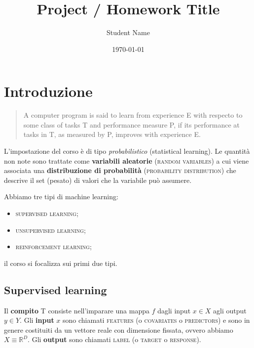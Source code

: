 \documentclass[10pt]{article}
\begin{document}
\title{Project / Homework Title}
\author{Student Name}
\date{\today}

\maketitle

\renewcommand{\vec}[1]{\boldsymbol{#1}}
\newcommand{\tens}[1]{\mathsf{#1}}
\newcommand{\pd}[2]{\frac{\partial #1}{\partial #2} }
\newcommand{\HALF}{\frac{1}{2}}
\newcommand{\DS}{\displaystyle}

\newcommand{\im}[1]{\textsc{#1}}

\theoremstyle{definition}
\newtheorem{example}{Esempio}[section]

\section{Introduzione}
%
%
\begin{quotation}
A computer program is said to learn from experience E with respecto to some class of tasks T and performance measure P, if its performance at tasks in T, as measured by P, improves with experience E.
\end{quotation}
L'impostazione del corso è di tipo \textit{probabilistico} (statistical learning). Le quantità non note sono trattate come \textbf{variabili aleatorie} (\im{random variables}) a cui viene associata una \textbf{distribuzione di probabilità} (\im{probability distribution}) che descrive il set (pesato) di valori che la variabile può assumere.

Abbiamo tre tipi di machine learning:
\begin{itemize}
\item \im{supervised learning};
\item \im{unsupervised learning};
\item \im{reinforcement learning};
\end{itemize}
il corso si focalizza sui primi due tipi.

\subsection{Supervised learning}
Il \textbf{compito} T consiste nell'imparare una mappa $f$ dagli input $x\in X$ agli output $y\in Y$. Gli \textbf{input} $x$ sono chiamati \im{features} (o \im{covariates} o \im{predictors}) e sono in genere costituiti da un vettore reale con dimensione fissata, ovvero abbiamo $X\equiv \mathbb{R}^D$. Gli \textbf{output} sono chiamati \im{label} (o \im{target} o \im{response}).
\end{document}
